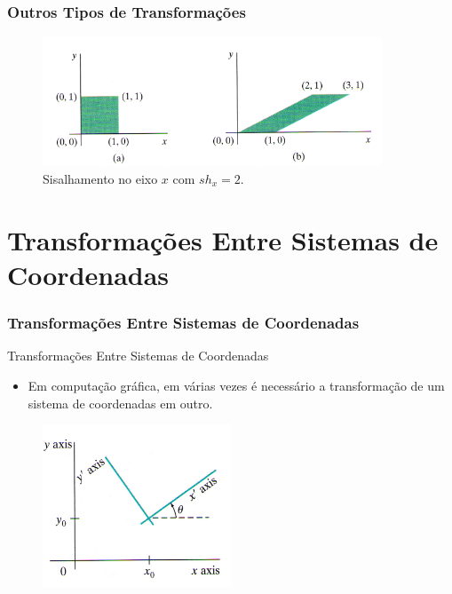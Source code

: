 \documentclass{beamer}
\begin{document}
\begin{frame}
\frametitle{Outros Tipos de Transformações}

	\begin{figure}[!h]
		\begin{center}
			\includegraphics[width=0.9\textwidth]{Figures/sisalhamento}
			\caption{Sisalhamento no eixo $x$ com $sh_x = 2$.}
		\end{center}
	\end{figure}
		
\end{frame}

\section{Transformações Entre Sistemas de Coordenadas}
\begin{frame}
\frametitle{Transformações Entre Sistemas de Coordenadas}

	\begin{block}{Transformações Entre Sistemas de Coordenadas}
		\begin{itemize}
			\item Em computação gráfica, em várias vezes é necessário a transformação de um sistema de coordenadas em outro.
		\end{itemize}
	\end{block}
	
	\begin{figure}[!h]
		\begin{center}
			\includegraphics[width=0.5\textwidth]{Figures/novaCoord}
			
		\end{center}
	\end{figure}
	
		
\end{frame}
\end{document}
